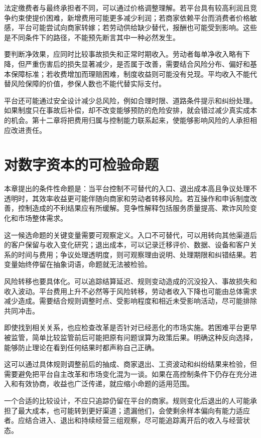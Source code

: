 \documentclass[UTF8,fontset=fandol,zihao=-4,oneside,openany]{ctexbook}
\begin{document}
\label{arg:P198}
法定缴费者与最终承担者不同，可以通过价格调整理解。若平台具有较高利润且竞争约束使提价困难，新增费用可能更多减少利润；若商家依赖平台而消费者价格敏感，平台可能尝试向商家转嫁；若劳动供给缺少替代，报酬也可能受到影响。这些是不同条件下的路径，不能预先断言其中一种必然发生。

要判断净效果，应同时比较事故损失和正常时期收入。劳动者每单净收入略有下降，但严重伤害后的损失显著减少，是否属于改善，需要结合风险分布、偏好和基本保障标准；若收费增加而理赔困难，制度收益则可能没有兑现。平均收入不能代替风险保障的价值，参保人数也不能代替实际支付。

平台还可能通过安全设计减少总风险，例如合理时限、道路条件提示和纠纷处理。如果制度只在事故后补偿，却不改变能够预防的危险安排，就会错过减少真实成本的机会。第十二章将把费用归属与控制能力联系起来，使能够影响风险的人承担相应改进责任。

\section{对数字资本的可检验命题}
本章提出的条件性命题是：当平台控制不可替代的入口、退出成本高且争议处理不透明时，其效率收益更可能伴随向商家和劳动者转移风险。若互操作和申诉制度改善，控制造成的不利结果应有所缓解。竞争性解释包括服务质量提高、欺诈风险变化和市场整体需求。

\label{arg:P199}
这一候选命题的关键变量需要可观察定义。入口不可替代，可以用转向其他渠道后的客户保留与收入变化研究；退出成本，可以记录迁移评价、数据、设备和客户关系的时间与费用；争议处理透明度，则可观察理由说明、处理期限和纠错结果。若变量始终停留在抽象词语，命题就无法被检验。

风险转移也要具体化。可以追踪结算延迟、规则变动造成的沉没投入、事故损失和收入波动。平台费用上升不必然等于风险转移，劳动者收入下降也可能由总体需求减少造成。需要结合规则调整时点、受影响程度和相近未受影响活动，尽可能排除共同冲击。

即使找到相关关系，也应检查改革是否针对已经恶化的市场实施。若困难平台更早被监管，简单比较监管前后可能把原有问题误算为政策后果。明确这种反向选择，能够防止理论在看到任何结果时都声称自己正确。

这可以通过具体规则调整前后的抽成、商家退出、工资波动和纠纷结果来检验，但需要避免把平台自主改革和市场变化混为一谈。如果在高控制条件下仍存在充分进入和有效协商，收益也广泛传递，就应缩小命题的适用范围。

\label{arg:P200}
一个合适的比较设计，不应只追踪仍留在平台的商家。规则变化后退出的人可能承担了最大成本，也可能转到更好渠道；遗漏他们，会使剩余样本偏向有能力适应者。应结合进入、退出和持续经营三组观察，尽可能追踪离开后的收入与经营状态。
\end{document}
